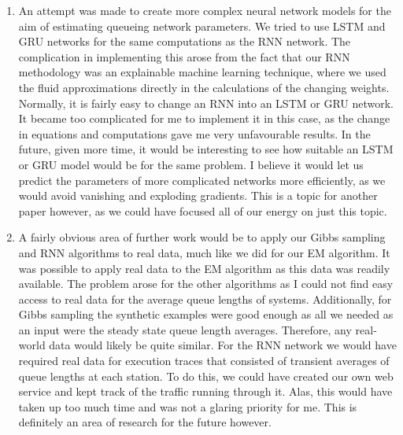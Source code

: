 \documentclass[a4paper,11pt,titlepage]{article}
\begin{document}
\begin{enumerate}
    \item An attempt was made to create more complex neural network models for the aim of estimating queueing network parameters. We tried to use LSTM and GRU networks for the same computations as the RNN network. The complication in implementing this arose from the fact that our RNN methodology was an explainable machine learning technique, where we used the fluid approximations directly in the calculations of the changing weights. Normally, it is fairly easy to change an RNN into an LSTM or GRU network. It became too complicated for me to implement it in this case, as the change in equations and computations gave me very unfavourable results. In the future, given more time, it would be interesting to see how suitable an LSTM or GRU model would be for the same problem. I believe it would let us predict the parameters of more complicated networks more efficiently, as we would avoid vanishing and exploding gradients. This is a topic for another paper however, as we could have focused all of our energy on just this topic. 
    \item A fairly obvious area of further work would be to apply our Gibbs sampling and RNN algorithms to real data, much like we did for our EM algorithm. It was possible to apply real data to the EM algorithm as this data was readily available. The problem arose for the other algorithms as I could not find easy access to real data for the average queue lengths of systems. Additionally, for Gibbs sampling the synthetic examples were good enough as all we needed as an input were the steady state queue length averages. Therefore, any real-world data would likely be quite similar. For the RNN network we would have required real data for execution traces that consisted of transient averages of queue lengths at each station. To do this, we could have created our own web service and kept track of the traffic running through it. Alas, this would have taken up too much time and was not a glaring priority for me. This is definitely an area of research for the future however. 

\end{enumerate}
\end{document}
